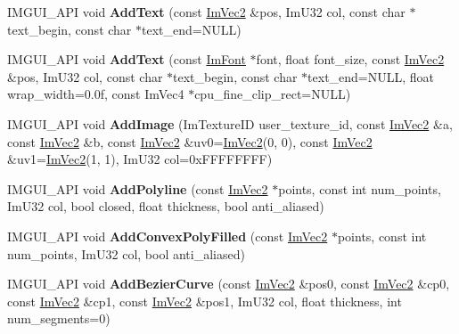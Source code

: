 \begin{DoxyCompactItemize}
I\+M\+G\+U\+I\+\_\+\+A\+PI void {\bfseries Add\+Text} (const \mbox{\hyperlink{struct_im_vec2}{Im\+Vec2}} \&pos, Im\+U32 col, const char $\ast$text\+\_\+begin, const char $\ast$text\+\_\+end=N\+U\+LL)
\item 
\mbox{\label{struct_im_draw_list_a8998356210b4c6c063a71a4af890d3fd}} 
I\+M\+G\+U\+I\+\_\+\+A\+PI void {\bfseries Add\+Text} (const \mbox{\hyperlink{struct_im_font}{Im\+Font}} $\ast$font, float font\+\_\+size, const \mbox{\hyperlink{struct_im_vec2}{Im\+Vec2}} \&pos, Im\+U32 col, const char $\ast$text\+\_\+begin, const char $\ast$text\+\_\+end=N\+U\+LL, float wrap\+\_\+width=0.\+0f, const Im\+Vec4 $\ast$cpu\+\_\+fine\+\_\+clip\+\_\+rect=\+N\+U\+L\+L)
\item 
\mbox{\label{struct_im_draw_list_a56f40a2a8d5f309a4c032aac70e1a765}} 
I\+M\+G\+U\+I\+\_\+\+A\+PI void {\bfseries Add\+Image} (Im\+Texture\+ID user\+\_\+texture\+\_\+id, const \mbox{\hyperlink{struct_im_vec2}{Im\+Vec2}} \&a, const \mbox{\hyperlink{struct_im_vec2}{Im\+Vec2}} \&b, const \mbox{\hyperlink{struct_im_vec2}{Im\+Vec2}} \&uv0=\mbox{\hyperlink{struct_im_vec2}{Im\+Vec2}}(0, 0), const \mbox{\hyperlink{struct_im_vec2}{Im\+Vec2}} \&uv1=\mbox{\hyperlink{struct_im_vec2}{Im\+Vec2}}(1, 1), Im\+U32 col=0x\+F\+F\+F\+F\+F\+F\+F\+F)
\item 
\mbox{\label{struct_im_draw_list_a77b2dae2d0b7c1498b8844abb87308a6}} 
I\+M\+G\+U\+I\+\_\+\+A\+PI void {\bfseries Add\+Polyline} (const \mbox{\hyperlink{struct_im_vec2}{Im\+Vec2}} $\ast$points, const int num\+\_\+points, Im\+U32 col, bool closed, float thickness, bool anti\+\_\+aliased)
\item 
\mbox{\label{struct_im_draw_list_ac5df2073259ae2ca1797838835004ed8}} 
I\+M\+G\+U\+I\+\_\+\+A\+PI void {\bfseries Add\+Convex\+Poly\+Filled} (const \mbox{\hyperlink{struct_im_vec2}{Im\+Vec2}} $\ast$points, const int num\+\_\+points, Im\+U32 col, bool anti\+\_\+aliased)
\item 
\mbox{\label{struct_im_draw_list_a990409b6456377fdf4578082a468a378}} 
I\+M\+G\+U\+I\+\_\+\+A\+PI void {\bfseries Add\+Bezier\+Curve} (const \mbox{\hyperlink{struct_im_vec2}{Im\+Vec2}} \&pos0, const \mbox{\hyperlink{struct_im_vec2}{Im\+Vec2}} \&cp0, const \mbox{\hyperlink{struct_im_vec2}{Im\+Vec2}} \&cp1, const \mbox{\hyperlink{struct_im_vec2}{Im\+Vec2}} \&pos1, Im\+U32 col, float thickness, int num\+\_\+segments=0)

\end{DoxyCompactItemize}
